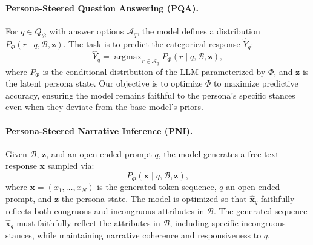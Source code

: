 \paragraph{Persona-Steered Question Answering (PQA).}
For $q \in Q_{\mathcal{B}}$ with answer options $\mathcal{A}_q$, the model defines a distribution $P_\Phi(r \mid q, \mathcal{B}, \mathbf{z})$. The task is to predict the categorical response $\hat{Y}_q$:
\begin{equation}
\label{eq:pqa}
    \hat{Y}_q = \operatorname{argmax}_{r \in \mathcal{A}_q} P_\Phi(r \mid q, \mathcal{B}, \mathbf{z}),
\end{equation}
where $P_\Phi$ is the conditional distribution of the LLM parameterized by $\Phi$, and $\mathbf{z}$ is the latent persona state. Our objective is to optimize $\Phi$ to maximize predictive accuracy, ensuring the model remains faithful to the persona’s specific stances even when they deviate from the base model's priors.

\paragraph{Persona-Steered Narrative Inference (PNI).}
Given $\mathcal{B}$, $\mathbf{z}$, and an open-ended prompt $q$, the model generates a free-text response $\mathbf{x}$ sampled via:
\begin{equation}
\label{eq:pni}
    P_\Phi(\mathbf{x} \mid q, \mathcal{B}, \mathbf{z}),
\end{equation}
where $\mathbf{x} = (x_1, \ldots, x_N)$ is the generated token sequence, $q$ an open-ended prompt, and $\mathbf{z}$ the persona state. The model is optimized so that $\hat{\mathbf{x}}_q$ faithfully reflects both congruous and incongruous attributes in $\mathcal{B}$.
The generated sequence $\hat{\mathbf{x}}_q$ must faithfully reflect the attributes in $\mathcal{B}$, including specific incongruous stances, while maintaining narrative coherence and responsiveness to $q$.






